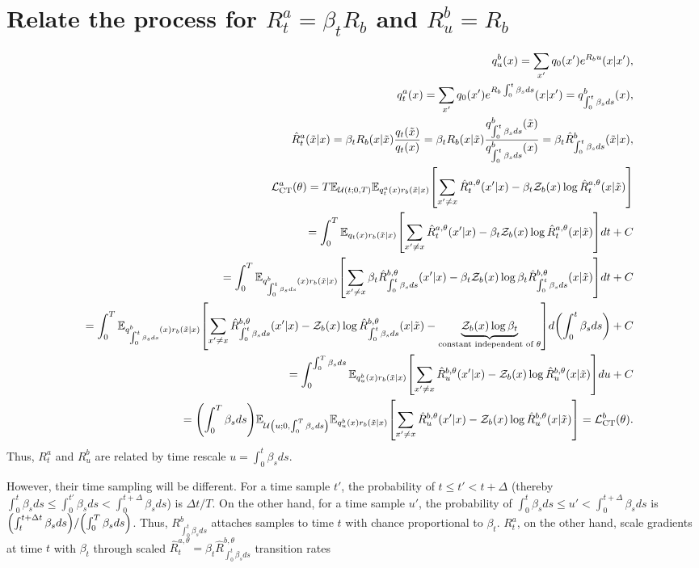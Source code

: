 \documentclass[10pt]{article}
\begin{document}
\section{Relate the process for $R^a_t=\beta_t R_b$ and $R^b_u=R_b$}
\begin{eqnarray*}
  &&q^b_u(x) = \sum_{x'} q_0(x')e^{R_bu}(x|x'),\\
  &&q^a_t(x) = \sum_{x'} q_0(x')e^{R_b\int_0^t \beta_s ds}(x|x')=q^b_{\int_0^t\beta_s ds}(x),\\
  &&\hat{R}^a_t(\tilde{x}|x)=\beta_t R_b(x|\tilde{x})\frac{q_t(\tilde{x})}{q_t(x)}=\beta_t R_b(x|\tilde{x})\frac{q^b_{\int_0^t\beta_s ds}(\tilde{x})}{q^b_{\int_0^t\beta_s ds}(x)} = \beta_t \hat{R}^b_{\int_0^t\beta_s ds}(\tilde{x}|x),\\
  &&\mathcal{L}^a_\text{CT}(\theta)=T\mathbb{E}_{\mathcal{U}(t;0,T)}\mathbb{E}_{q^a_t(x)r_b(\tilde{x}|x)}\qty[\sum_{x'\neq x}\hat{R}^{a,\theta}_t(x'|x) - \beta_t\mathcal{Z}_b(x)\log\hat{R}^{a,\theta}_t(x|\tilde{x})]\\
  &&=\int_0^T \mathbb{E}_{q_t(x)r_b(\tilde{x}|x)}\qty[\sum_{x'\neq x}\hat{R}^{a,\theta}_t(x'|x) - \beta_t\mathcal{Z}_b(x)\log\hat{R}^{a,\theta}_t(x|\tilde{x})]dt + C\\
  &&=\int_0^T \mathbb{E}_{q^b_{\int_0^t \beta_s ds}(x)r_b(\tilde{x}|x)}\qty[\sum_{x'\neq x}\beta_t\hat{R}^{b,\theta}_{\int_0^t\beta_s ds}(x'|x) - \beta_t\mathcal{Z}_b(x)\log\beta_t\hat{R}^{b,\theta}_{\int_0^t\beta_s ds}(x|\tilde{x})]dt + C\\
  &&=\int_0^T \mathbb{E}_{q^b_{\int_0^t \beta_s ds}(x)r_b(\tilde{x}|x)}\qty[\sum_{x'\neq x}\hat{R}^{b,\theta}_{\int_0^t\beta_s ds}(x'|x) - \mathcal{Z}_b(x)\log\hat{R}^{b,\theta}_{\int_0^t\beta_s ds}(x|\tilde{x}) - \underbrace{\mathcal{Z}_b(x)\log\beta_t}_\text{constant independent of $\theta$}]d\qty(\int_0^t\beta_s ds) + C\\
  &&=\int_0^{\int_0^T\beta_s ds} \mathbb{E}_{q^b_u(x)r_b(\tilde{x}|x)}\qty[\sum_{x'\neq x}\hat{R}^{b,\theta}_u(x'|x) - \mathcal{Z}_b(x)\log\hat{R}^{b,\theta}_u(x|\tilde{x})]du + C\\
  &&=\qty(\int_0^T\beta_s ds)\mathbb{E}_{\mathcal{U}\qty(u;0,\int_0^T\beta_s ds)}\mathbb{E}_{q^b_u(x)r_b(\tilde{x}|x)}\qty[\sum_{x'\neq x}\hat{R}^{b,\theta}_u(x'|x) - \mathcal{Z}_b(x)\log\hat{R}^{b,\theta}_u(x|\tilde{x})]=\mathcal{L}^b_\text{CT}(\theta).
\end{eqnarray*}
Thus, $R^a_t$ and $R^b_u$ are related by time rescale $u=\int_0^t\beta_s ds$.

However, their time sampling will be different. For a time sample $t'$, the probability of $t\le t'< t+\Delta$ (thereby $\int_0^{t}\beta_s ds \le \int_0^{t'}\beta_s ds < \int_0^{t+\Delta}\beta_s ds$) is $\Delta t/T$. On the other hand, for a time sample $u'$, the probability of $\int_0^{t}\beta_s ds \le u' < \int_0^{t+\Delta}\beta_s ds$ is $\qty(\int_t^{t+\Delta t}\beta_s ds)/\qty(\int_0^T\beta_s ds)$. Thus, $R^b_{\int_0^t\beta_s ds}$ attaches samples to time $t$ with chance proportional to $\beta_t$. $R^a_t$, on the other hand, scale gradients at time $t$ with $\beta_t$ through scaled $\hat{R}^{a,\theta}_t=\beta_t\hat{R}^{b,\theta}_{\int_0^t\beta_s ds}$ transition rates
\end{document}
